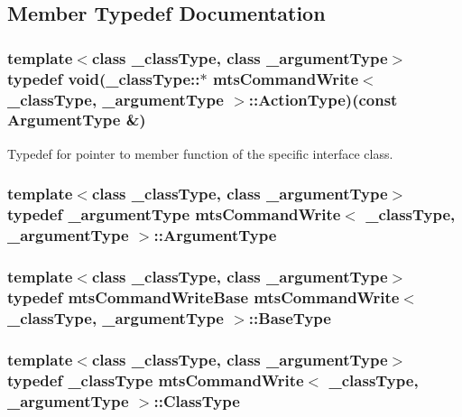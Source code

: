 \subsection{Member Typedef Documentation}
\hypertarget{classmts_command_write_a1327ec4d03afcafbbbd91c8fc3f3c090}{
\subsubsection[{Action\-Type}]{\setlength{\rightskip}{0pt plus 5cm}template$<$class \-\_\-class\-Type, class \-\_\-argument\-Type$>$ typedef void(\-\_\-class\-Type\-::$\ast$ {\bf mts\-Command\-Write}$<$ \-\_\-class\-Type, \-\_\-argument\-Type $>$\-::Action\-Type)(const {\bf Argument\-Type} \&)}}\label{classmts_command_write_a1327ec4d03afcafbbbd91c8fc3f3c090}
Typedef for pointer to member function of the specific interface class. \hypertarget{classmts_command_write_aa8ff942dbc4caedb34d83a5d6bf47c10}{
\subsubsection[{Argument\-Type}]{\setlength{\rightskip}{0pt plus 5cm}template$<$class \-\_\-class\-Type, class \-\_\-argument\-Type$>$ typedef \-\_\-argument\-Type {\bf mts\-Command\-Write}$<$ \-\_\-class\-Type, \-\_\-argument\-Type $>$\-::{\bf Argument\-Type}}}\label{classmts_command_write_aa8ff942dbc4caedb34d83a5d6bf47c10}
\hypertarget{classmts_command_write_a40dcfd022c15b4411c0eb5d8fc670dcd}{
\subsubsection[{Base\-Type}]{\setlength{\rightskip}{0pt plus 5cm}template$<$class \-\_\-class\-Type, class \-\_\-argument\-Type$>$ typedef {\bf mts\-Command\-Write\-Base} {\bf mts\-Command\-Write}$<$ \-\_\-class\-Type, \-\_\-argument\-Type $>$\-::{\bf Base\-Type}}}\label{classmts_command_write_a40dcfd022c15b4411c0eb5d8fc670dcd}
\hypertarget{classmts_command_write_aeccc8c434133c4adae34916b42ad493c}{
\subsubsection[{Class\-Type}]{\setlength{\rightskip}{0pt plus 5cm}template$<$class \-\_\-class\-Type, class \-\_\-argument\-Type$>$ typedef \-\_\-class\-Type {\bf mts\-Command\-Write}$<$ \-\_\-class\-Type, \-\_\-argument\-Type $>$\-::{\bf Class\-Type}}}\label{classmts_command_write_aeccc8c434133c4adae34916b42ad493c}
